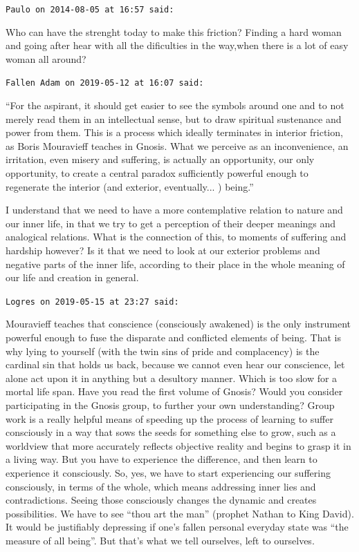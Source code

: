 \begin{footnotesize}
\begin{sffamily}
\texttt{Paulo on 2014-08-05 at 16:57 said:}

Who can have the strenght today to make this friction? Finding a hard woman and going after hear with all the dificulties in the way,when there is a lot of easy woman all around?

\hfill

\texttt{Fallen Adam on 2019-05-12 at 16:07 said:}

``For the aspirant, it should get easier to see the symbols around one and to not merely read them in an intellectual sense, but to draw spiritual sustenance and power from them. This is a process which ideally terminates in interior friction, as Boris Mouravieff teaches in Gnosis. What we perceive as an inconvenience, an irritation, even misery and suffering, is actually an opportunity, our only opportunity, to create a central paradox sufficiently powerful enough to regenerate the interior (and exterior, eventually... ) being.''

I understand that we need to have a more contemplative relation to nature and our inner life, in that we try to get a perception of their deeper meanings and analogical relations. What is the connection of this, to moments of suffering and hardship however? Is it that we need to look at our exterior problems and negative parts of the inner life, according to their place in the whole meaning of our life and creation in general.

\hfill

\texttt{Logres on 2019-05-15 at 23:27 said:}

Mouravieff teaches that conscience (consciously awakened) is the only instrument powerful enough to fuse the disparate and conflicted elements of being. That is why lying to yourself (with the twin sins of pride and complacency) is the cardinal sin that holds us back, because we cannot even hear our conscience, let alone act upon it in anything but a desultory manner. Which is too slow for a mortal life span. Have you read the first volume of Gnosis? Would you consider participating in the Gnosis group, to further your own understanding? Group work is a really helpful means of speeding up the process of learning to suffer consciously in a way that sows the seeds for something else to grow, such as a worldview that more accurately reflects objective reality and begins to grasp it in a living way. But you have to experience the difference, and then learn to experience it consciously. So, yes, we have to start experiencing our suffering consciously, in terms of the whole, which means addressing inner lies and contradictions. Seeing those consciously changes the dynamic and creates possibilities. We have to see ``thou art the man'' (prophet Nathan to King David). It would be justifiably depressing if one's fallen personal everyday state was ``the measure of all being''. But that's what we tell ourselves, left to ourselves.


\end{sffamily}
\end{footnotesize}
